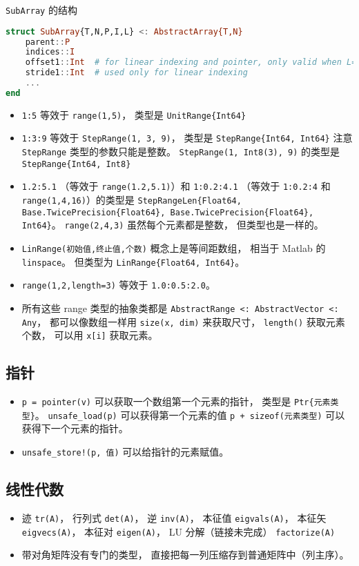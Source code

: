 \verb|SubArray| 的结构
\begin{lstlisting}[language=julia]
struct SubArray{T,N,P,I,L} <: AbstractArray{T,N}
    parent::P
    indices::I
    offset1::Int  # for linear indexing and pointer, only valid when L==true
    stride1::Int  # used only for linear indexing
    ...
end
\end{lstlisting}

\begin{itemize}
\item \verb|1:5| 等效于 \verb|range(1,5)|， 类型是 \verb|UnitRange{Int64}|
\item \verb|1:3:9| 等效于 \verb|StepRange(1, 3, 9)|， 类型是 \verb|StepRange{Int64, Int64}| 注意 \verb|StepRange| 类型的参数只能是整数。 \verb|StepRange(1, Int8(3), 9)| 的类型是 \verb|StepRange{Int64, Int8}|
\item \verb|1.2:5.1| （等效于 \verb|range(1.2,5.1)|）和 \verb|1:0.2:4.1| （等效于 \verb|1:0.2:4| 和 \verb|range(1,4,16)|）的类型是 \verb|StepRangeLen{Float64, Base.TwicePrecision{Float64}, Base.TwicePrecision{Float64}, Int64}|。 \verb|range(2,4,3)| 虽然每个元素都是整数， 但类型也是一样的。
\item \verb|LinRange(初始值,终止值,个数)| 概念上是等间距数组， 相当于 Matlab 的 \verb|linspace|。 但类型为 \verb|LinRange{Float64, Int64}|。
\item \verb|range(1,2,length=3)| 等效于 \verb|1.0:0.5:2.0|。
\item 所有这些 range 类型的抽象类都是 \verb|AbstractRange <: AbstractVector <: Any|， 都可以像数组一样用 \verb|size(x, dim)| 来获取尺寸， \verb|length()| 获取元素个数， 可以用 \verb|x[i]| 获取元素。
\end{itemize}

\subsection{指针}
\begin{itemize}
\item \verb|p = pointer(v)| 可以获取一个数组第一个元素的指针， 类型是 \verb|Ptr{元素类型}|。 \verb|unsafe_load(p)| 可以获得第一个元素的值 \verb|p + sizeof(元素类型)| 可以获得下一个元素的指针。
\item \verb|unsafe_store!(p, 值)| 可以给指针的元素赋值。
\end{itemize}

\subsection{线性代数}
\begin{itemize}
\item 迹 \verb|tr(A)|， 行列式 \verb|det(A)|， 逆 \verb|inv(A)|， 本征值 \verb|eigvals(A)|， 本征矢 \verb|eigvecs(A)|， 本征对 \verb|eigen(A)|， LU 分解（链接未完成） \verb|factorize(A)|
\item 带对角矩阵没有专门的类型， 直接把每一列压缩存到普通矩阵中（列主序）。
\end{itemize}


